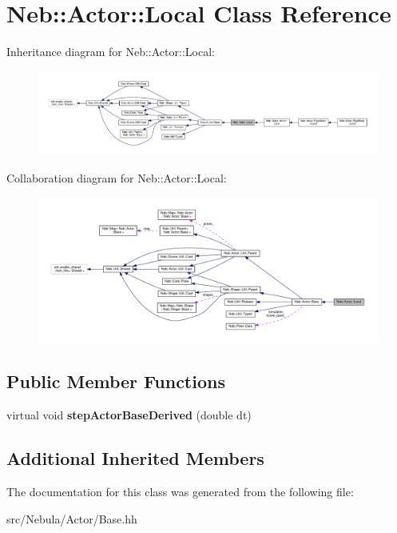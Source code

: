 \hypertarget{classNeb_1_1Actor_1_1Local}{\section{Neb\-:\-:Actor\-:\-:Local Class Reference}
\label{classNeb_1_1Actor_1_1Local}
}


Inheritance diagram for Neb\-:\-:Actor\-:\-:Local\-:
\nopagebreak
\begin{figure}[H]
\begin{center}
\leavevmode
\includegraphics[width=350pt]{classNeb_1_1Actor_1_1Local__inherit__graph}
\end{center}
\end{figure}


Collaboration diagram for Neb\-:\-:Actor\-:\-:Local\-:
\nopagebreak
\begin{figure}[H]
\begin{center}
\leavevmode
\includegraphics[width=350pt]{classNeb_1_1Actor_1_1Local__coll__graph}
\end{center}
\end{figure}
\subsection*{Public Member Functions}
\begin{DoxyCompactItemize}
\item 
\hypertarget{classNeb_1_1Actor_1_1Local_a4c2b98d7143d883d724c3871acca4eac}{virtual void {\bfseries step\-Actor\-Base\-Derived} (double dt)}\label{classNeb_1_1Actor_1_1Local_a4c2b98d7143d883d724c3871acca4eac}

\end{DoxyCompactItemize}
\subsection*{Additional Inherited Members}


The documentation for this class was generated from the following file\-:\begin{DoxyCompactItemize}
\item 
src/\-Nebula/\-Actor/Base.\-hh\end{DoxyCompactItemize}
